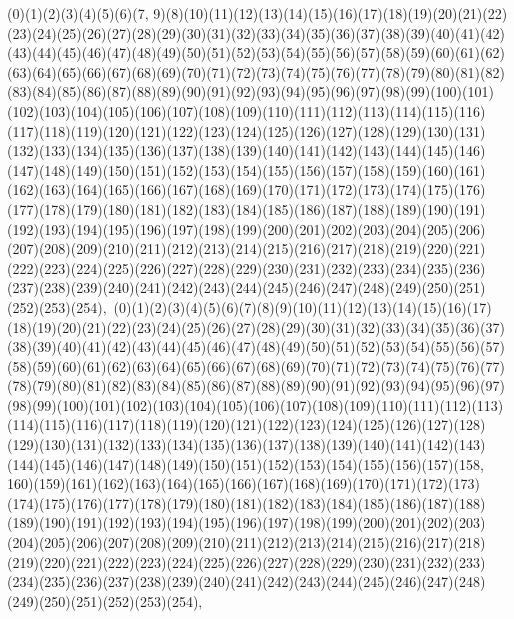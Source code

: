 \documentclass[12pt]{article}
\begin{document}
{(0)(1)(2)(3)(4)(5)(6)(7, 9)(8)(10)(11)(12)(13)(14)(15)(16)(17)(18)(19)(20)(21)(22)(23)(24)(25)(26)(27)(28)(29)(30)(31)(32)(33)(34)(35)(36)(37)(38)(39)(40)(41)(42)(43)(44)(45)(46)(47)(48)(49)(50)(51)(52)(53)(54)(55)(56)(57)(58)(59)(60)(61)(62)(63)(64)(65)(66)(67)(68)(69)(70)(71)(72)(73)(74)(75)(76)(77)(78)(79)(80)(81)(82)(83)(84)(85)(86)(87)(88)(89)(90)(91)(92)(93)(94)(95)(96)(97)(98)(99)(100)(101)(102)(103)(104)(105)(106)(107)(108)(109)(110)(111)(112)(113)(114)(115)(116)(117)(118)(119)(120)(121)(122)(123)(124)(125)(126)(127)(128)(129)(130)(131)(132)(133)(134)(135)(136)(137)(138)(139)(140)(141)(142)(143)(144)(145)(146)(147)(148)(149)(150)(151)(152)(153)(154)(155)(156)(157)(158)(159)(160)(161)(162)(163)(164)(165)(166)(167)(168)(169)(170)(171)(172)(173)(174)(175)(176)(177)(178)(179)(180)(181)(182)(183)(184)(185)(186)(187)(188)(189)(190)(191)(192)(193)(194)(195)(196)(197)(198)(199)(200)(201)(202)(203)(204)(205)(206)(207)(208)(209)(210)(211)(212)(213)(214)(215)(216)(217)(218)(219)(220)(221)(222)(223)(224)(225)(226)(227)(228)(229)(230)(231)(232)(233)(234)(235)(236)(237)(238)(239)(240)(241)(242)(243)(244)(245)(246)(247)(248)(249)(250)(251)(252)(253)(254)$
, 
$
(0)(1)(2)(3)(4)(5)(6)(7)(8)(9)(10)(11)(12)(13)(14)(15)(16)(17)(18)(19)(20)(21)(22)(23)(24)(25)(26)(27)(28)(29)(30)(31)(32)(33)(34)(35)(36)(37)(38)(39)(40)(41)(42)(43)(44)(45)(46)(47)(48)(49)(50)(51)(52)(53)(54)(55)(56)(57)(58)(59)(60)(61)(62)(63)(64)(65)(66)(67)(68)(69)(70)(71)(72)(73)(74)(75)(76)(77)(78)(79)(80)(81)(82)(83)(84)(85)(86)(87)(88)(89)(90)(91)(92)(93)(94)(95)(96)(97)(98)(99)(100)(101)(102)(103)(104)(105)(106)(107)(108)(109)(110)(111)(112)(113)(114)(115)(116)(117)(118)(119)(120)(121)(122)(123)(124)(125)(126)(127)(128)(129)(130)(131)(132)(133)(134)(135)(136)(137)(138)(139)(140)(141)(142)(143)(144)(145)(146)(147)(148)(149)(150)(151)(152)(153)(154)(155)(156)(157)(158, 160)(159)(161)(162)(163)(164)(165)(166)(167)(168)(169)(170)(171)(172)(173)(174)(175)(176)(177)(178)(179)(180)(181)(182)(183)(184)(185)(186)(187)(188)(189)(190)(191)(192)(193)(194)(195)(196)(197)(198)(199)(200)(201)(202)(203)(204)(205)(206)(207)(208)(209)(210)(211)(212)(213)(214)(215)(216)(217)(218)(219)(220)(221)(222)(223)(224)(225)(226)(227)(228)(229)(230)(231)(232)(233)(234)(235)(236)(237)(238)(239)(240)(241)(242)(243)(244)(245)(246)(247)(248)(249)(250)(251)(252)(253)(254)$
, 
$
}
\end{document}
